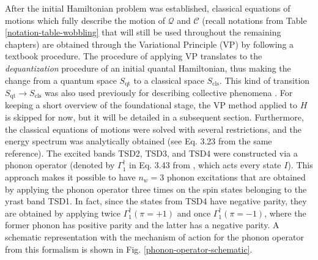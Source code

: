After the initial Hamiltonian problem was established, classical equations of motions which fully describe the motion of $\mathcal{Q}$ and $\mathscr{C}$ (recall notations from Table \ref{notation-table-wobbling} that will still be used throughout the remaining chapters) are obtained through the Variational Principle (VP) by following a textbook procedure. The procedure of applying VP translates to the \emph{dequantization} procedure of an initial quantal Hamiltonian, thus making the change from a quantum space $S_\text{qt}$ to a classical space $S_\text{cls}$. This kind of transition $S_\text{qt}\to S_\text{cls}$ was also used previously for describing collective phenomena \cite{raduta2007semiclassical,chen2016two,budaca2018tilted}. For keeping a short overview of the foundational stage, the VP method applied to $H$ is skipped for now, but it will be detailed in a subsequent section. Furthermore, the classical equations of motions were solved with several restrictions, and the energy spectrum was analytically obtained (see Eq. 3.23 from the same reference). The excited bands TSD2, TSD3, and TSD4 were constructed via a phonon operator (denoted by $\Gamma_1^\dagger$ in Eq. 3.43 from \cite{raduta2017semiclassical}, which acts every state $I$). This approach makes it possible to have $n_w=3$ phonon excitations that are obtained by applying the phonon operator three times on the spin states belonging to the yrast band TSD1. In fact, since the states from TSD4 have negative parity, they are obtained by applying twice $\Gamma_1^\dagger(\pi=+1)$ and once $\Gamma_1^\dagger(\pi=-1)$, where the former phonon has positive parity and the latter has a negative parity. A schematic representation with the mechanism of action for the phonon operator from this formalism is shown in Fig. \ref{phonon-operator-schematic}.
